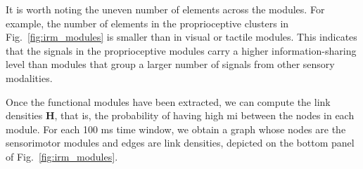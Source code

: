 \documentclass[letterpaper, 10 pt, conference]{ieeeconf}  %
\begin{document}
It is worth noting the uneven number of elements across the modules. For example, the number of elements in the proprioceptive clusters in Fig.~\ref{fig:irm_modules} is smaller than in visual or tactile modules. This indicates that the signals in the proprioceptive modules carry a higher information-sharing level than modules that group a larger number of signals from other sensory modalities.

Once the functional modules have been extracted, we can compute the link densities $\bm{H}$, that is, the probability of having high \ac{mi} between the nodes in each module. For each 100 ms time window, we obtain a graph whose nodes are the sensorimotor modules and edges are link densities, depicted on the bottom panel of Fig.~\ref{fig:irm_modules}.

\end{document}
